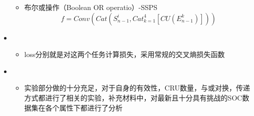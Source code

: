 \begin{itemize}[leftmargin=*]
{\begin{itemize}
			\begin{equation}g={Conv}\left(E_{n-1}^{i} \otimes \prod_{k=1}^{4} C U\left(S_{n-1}^{k}\right)\right)\end{equation}
			\item 布尔或操作（Boolean OR operatio）-SSPS
			\begin{equation}f={Conv}\left({Cat}\left(S_{n-1}^{i}, {Cat}_{k=1}^{4}\left[C U\left(E_{n-1}^{k}\right)\right]\right)\right)\end{equation}
		\end{itemize}
	}
	\item {}
	{\small
		\begin{itemize}
			\item loss分别就是对这两个任务计算损失，采用常规的交叉熵损失函数
		\end{itemize}
	}
	\item {}
	{\small
		\begin{itemize}
			\item 实验部分做的十分充足，对于自身的有效性，CRU数量，与或对换，传递方式都进行了相关的实验，补充材料中，对最新且十分具有挑战的SOC数据集在各个属性下都进行了分析
		\end{itemize}
	}
\end{itemize}